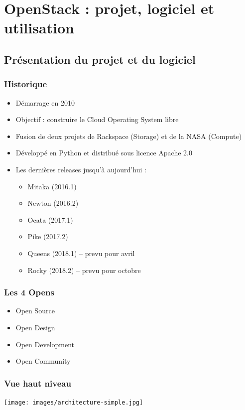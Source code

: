   \section[OpenStack]{OpenStack : projet, logiciel et utilisation}

  \subsection[OpenStack]{Présentation du projet et du logiciel}

  \begin{frame}
    \frametitle{Historique}
    \begin{itemize}
      \item Démarrage en 2010
      \item Objectif : construire le Cloud Operating System libre
      \item Fusion de deux projets de Rackspace (Storage) et de la NASA (Compute)
      \item Développé en Python et distribué sous licence Apache 2.0
      \item Les dernières releases jusqu'à aujourd'hui :
      \begin{itemize}
        \item Mitaka (2016.1)
        \item Newton (2016.2)
        \item Ocata (2017.1)
        \item Pike (2017.2)
        \item Queens (2018.1) -- prevu pour avril
        \item Rocky (2018.2) -- prevu pour octobre
      \end{itemize}
    \end{itemize}
  \end{frame}

  \begin{frame}
    \frametitle{Les 4 Opens}
    \begin{itemize}
      \item Open Source
      \item Open Design
      \item Open Development
      \item Open Community
    \end{itemize}
  \end{frame}

  \begin{frame}
    \frametitle{Vue haut niveau}
    \texttt{[image: images/architecture-simple.jpg]}
  \end{frame}

